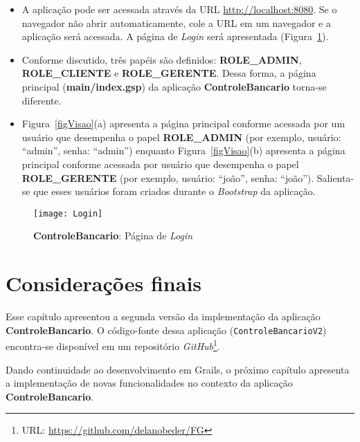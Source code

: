 \begin{itemize}

\item     A     aplicação    pode     ser     acessada     através    da     URL
  {\footnotesize\url{http://localhost:8080}}.    Se   o   navegador  não   abrir
  automaticamente, cole  a URL em um  navegador e a aplicação  será acessada.  A
  página de {\it Login} será apresentada (Figura~\ref{figExecutar}).

\vspace{0.3cm}

\item  Conforme discutido, três  papéis são  definidos: {\bf  ROLE\_ADMIN}, {\bf
  ROLE\_CLIENTE}  e  {\bf  ROLE\_GERENTE}.   Dessa  forma,  a  página  principal
  ({\bf main/index.gsp}) da aplicação {\bf ControleBancario} torna-se diferente.  

\vspace{0.3cm}

\item  Figura~\ref{figVisao}(a) apresenta a  página principal  conforme acessada
  por um usuário que desempenha o papel {\bf ROLE\_ADMIN} (por exemplo, usuário:
  ``admin'',  senha: ``admin'')  enquanto  Figura~\ref{figVisao}(b) apresenta  a
  página principal  conforme acessada  por usuário que  desempenha o  papel {\bf
    ROLE\_GERENTE}      (por     exemplo,     usuário:      ``joão'',     senha:
  ``joão'').  Salienta-se  que  esses  usuários  foram criados  durante  o  {\it
    Bootstrap} da aplicação.

\end{itemize}

\vspace{0.2cm}

\begin{figure}[htbp]
\centering\texttt{[image: Login]}
\caption{{\bf ControleBancario}: Página de {\it Login}}
\label{figExecutar}
\end{figure}

\section{Considerações finais}

\vspace{0.3cm}

Esse capítulo apresentou a segunda versão da implementação da aplicação {\bf
  ControleBancario}.         O        código-fonte        dessa        aplicação
({\footnotesize\texttt{ControleBancarioV2}})   encontra-se   disponível  em   um
repositório                      {\it                      GitHub}\footnote{URL:
  {\url{https://github.com/delanobeder/FG}}}.  

\vspace{0.2cm}

Dando continuidade ao desenvolvimento em  Grails, o próximo capítulo apresenta a
implementação   de  novas   funcionalidades  no   contexto  da   aplicação  {\bf
  ControleBancario}. 
